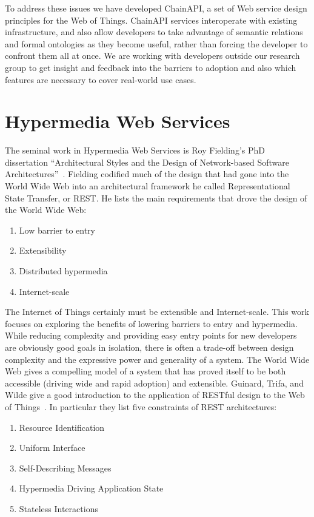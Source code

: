 \documentclass{acm_proc_article-sp}
\newenvironment{tightenumerate}{
    \vspace{-10pt}
    \begin{enumerate}
        \setlength{\parskip}{-1pt}}{
    \end{enumerate}
    \vspace{-10pt}}
\begin{document}
To address these issues we have developed ChainAPI, a set of Web service design
principles for the Web of Things. ChainAPI services interoperate with existing
infrastructure, and also allow developers to take advantage of semantic
relations and formal ontologies as they become useful, rather than forcing the
developer to confront them all at once. We are working with developers outside
our research group to get insight and feedback into the barriers to adoption
and also which features are necessary to cover real-world use cases.

\section{Hypermedia Web Services}

The seminal work in Hypermedia Web Services is Roy Fielding's PhD dissertation
``Architectural Styles and the Design of Network-based Software
Architectures''~\cite{fielding}. Fielding codified much of the design that had
gone into the World Wide Web into an architectural framework he called
Representational State Transfer, or REST. He lists the main requirements that
drove the design of the World Wide Web:

\begin{tightenumerate}
    \item Low barrier to entry
    \item Extensibility
    \item Distributed hypermedia
    \item Internet-scale
\end{tightenumerate}

The Internet of Things certainly must be extensible and Internet-scale. This
work focuses on exploring the benefits of lowering barriers to entry and
hypermedia. While reducing complexity and providing easy entry points for new
developers are obviously good goals in isolation, there is often a trade-off
between design complexity and the expressive power and generality of a system.
The World Wide Web gives a compelling model of a system that has
proved itself to be both accessible (driving wide and rapid adoption) and
extensible. Guinard, Trifa, and Wilde give a good introduction to the
application of RESTful design to the Web of Things~\cite{guinard2010}. In
particular they list five constraints of REST architectures:

\begin{tightenumerate}
    \item Resource Identification
    \item Uniform Interface
    \item Self-Describing Messages
    \item Hypermedia Driving Application State
    \item Stateless Interactions
\end{tightenumerate}
\end{document}
